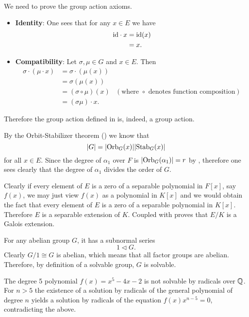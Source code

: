 \begin{questions}
    \item We need to prove the group action axioms.
    \begin{itemize}
        \item \textbf{Identity}: One sees that for any $x \in E$ we have
        \begin{align*}
            \mathrm{id}\cdot x &= \mathrm{id}(x)\\
            &= x.
        \end{align*}
        \item \textbf{Compatibility}: Let $\sigma, \mu \in G$ and $x \in E$. Then
        \begin{align*}
            \sigma \cdot (\mu \cdot x) &= \sigma \cdot (\mu(x))\\
            &= \sigma(\mu(x))\\
            &= (\sigma\circ \mu)(x) & (\text{where } \circ \text{ denotes function composition})\\
            &= (\sigma\mu) \cdot x.
        \end{align*}
    \end{itemize}
    Therefore the group action defined in  is, indeed, a group action.

    \item By the Orbit-Stabilizer theorem () we know that
    \[
       |G| = |\mathrm{Orb}_{G}(x)||\mathrm{Stab}_{G}(x)|
    \]
    for all $x \in E$. Since the degree of $\alpha_1$ over $F$ is $|\mathrm{Orb}_{G}(\alpha_1)| = r$ by , therefore one sees clearly that the degree of $\alpha_1$ divides the order of $G$.

    \item Clearly if every element of $E$ is a zero of a separable polynomial in $F[x]$, say $f(x)$, we may just view $f(x)$ as a polynomial in $K[x]$ and we would obtain the fact that every element of $E$ is a zero of a separable polynomial in $K[x]$. Therefore $E$ is a separable extension of $K$. Coupled with  proves that $E/K$ is a Galois extension.

    \item For any abelian group $G$, it has a subnormal series
    \[
        1 \lhd G.
    \]
    Clearly $G/1 \cong G$ is abelian, which means that all factor groups are abelian. Therefore, by definition of a solvable group, $G$ is solvable.

    \item The degree 5 polynomial $f(x) = x^5 - 4x - 2$ is not solvable by radicals over $\mathbb{Q}$. For $n > 5$ the existence of a solution by radicals of the general polynomial of degree $n$ yields a solution by radicals of the equation $f(x)x^{n-5} = 0$, contradicting the above.
\end{questions}

